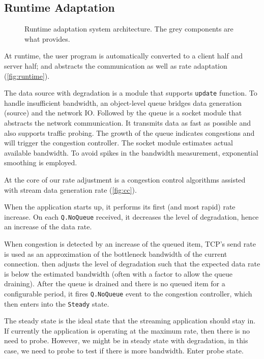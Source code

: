 \subsection{Runtime Adaptation}
\label{sec:runtime}

\begin{figure}
  \centering
  \resizebox{\columnwidth}{!}{
    
  }
  \caption{Runtime adaptation system architecture. The grey components are what
    \sysname{} provides.}
  \label{fig:runtime}
\end{figure}

At runtime, the user program is automatically converted to a client half and
server half; and \sysname{} abstracts the communication as well as rate
adaptation (\autoref{fig:runtime}).

The data source with degradation is a module that supports \texttt{update}
function. To handle insufficient bandwidth, an object-level queue bridges data
generation (source) and the network IO. Followed by the queue is a socket module
that abstracts the network communication. It transmits data as fast as possible
and also supports traffic probing. The growth of the queue indicates congestions
and will trigger the congestion controller. The socket module estimates actual
available bandwidth. To avoid spikes in the bandwidth measurement, exponential
smoothing is employed.

At the core of our rate adjustment is a congestion control algorithms assisted
with stream data generation rate (\autoref{fig:cc}).

 When the application starts up, it performs its first
(and most rapid) rate increase. On each \texttt{Q.NoQueue} received, it
decreases the level of degradation, hence an increase of the data rate.

 When congestion is detected by an increase of the
queued item, TCP's send rate is used as an approximation of the bottleneck
bandwidth of the current connection. \sysname{} then adjusts the level of
degradation such that the expected data rate is below the estimated bandwidth
(often with a factor to allow the queue draining). After the queue is drained
and there is no queued item for a configurable period, it fires
\texttt{Q.NoQueue} event to the congestion controller, which then enters into
the \texttt{Steady} state.

 The steady state is the ideal state that the streaming
application should stay in. If currently the application is operating at the
maximum rate, then there is no need to probe. However, we might be in steady
state with degradation, in this case, we need to probe to test if there is more
bandwidth. Enter probe state.

